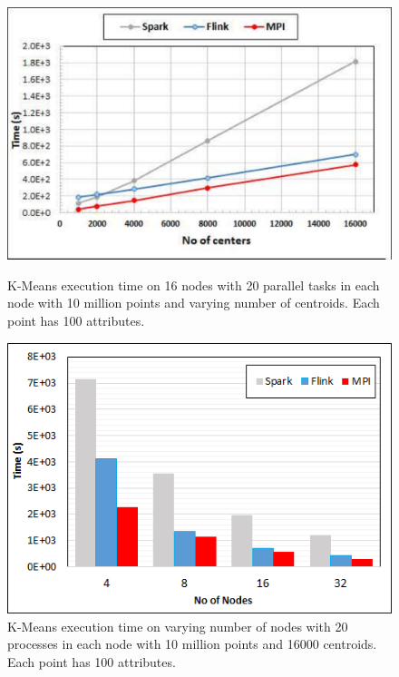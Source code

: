 \documentclass[conference]{IEEEtran}
\begin{document}
\begin{figure}[!htb]
\begin{minipage}{.49\textwidth}
    \centering
    \includegraphics[width=0.95\columnwidth]{images/k-means-centers.pdf}
    \caption{K-Means execution time on 16 nodes with 20 parallel tasks in each node with 10 million points and varying number of centroids. Each point has 100 attributes.}
    \label{fig:fig_k_means_centroids}
\end{minipage}
\hspace{1.4mm}
\begin{minipage}{.49\textwidth}
    \centering
    \includegraphics[width=0.95\columnwidth]{images/k-means-nodes.png}
    \caption{K-Means execution time on varying number of nodes with 20 processes in each node with 10 million points and 16000 centroids. Each point has 100 attributes.}
    \label{fig:fig_k_means_nodes}
\end{minipage}
\end{figure}
\end{document}
